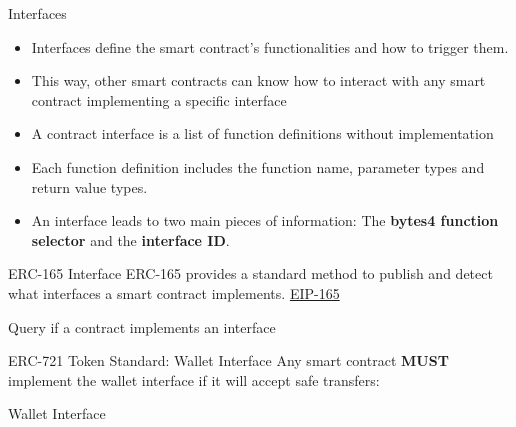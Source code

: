 \documentclass[handout]{beamer}
\begin{document}
\begin{frame}{Interfaces}
\begin{itemize}
	\item Interfaces define the smart contract's functionalities and how to trigger them.
	\item This way, other smart contracts can know how to interact with any smart contract implementing a specific interface
	\item A contract interface is a list of function definitions without implementation
	\item Each function definition includes the function name, parameter types and return value types.
	\item An interface leads to two main pieces of information: The \textbf{bytes4 function selector} and the \textbf{interface ID}.
\end{itemize}
\end{frame}

\begin{frame}{ERC-165 Interface}
ERC-165 provides a standard method to publish and detect what interfaces a smart contract implements. \link \href{https://eips.ethereum.org/EIPS/eip-165}{EIP-165}
	\begin{samplecode}{Query if a contract implements an interface}
			
	\end{samplecode}
\end{frame}

\begin{frame}{ERC-721 Token Standard: Wallet Interface}
\vspace{0.5em}
	Any smart contract \textbf{MUST} implement the wallet interface if it will accept safe transfers:
\vspace{1em}
	\begin{samplecode}{Wallet Interface}
		
	\end{samplecode}
\end{frame}
\end{document}

